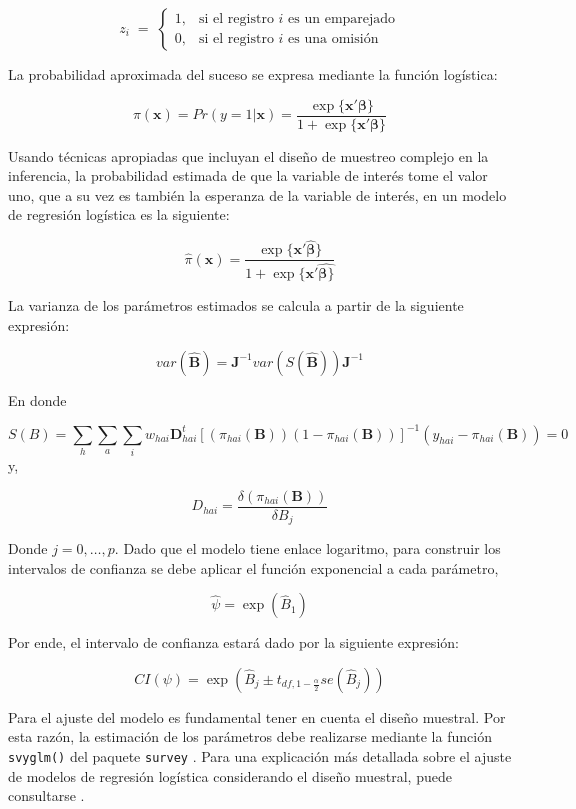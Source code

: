 \documentclass[
  12pt,
]{book}
\begin{document}
\[
z_i \;=\; 
\begin{cases}
1, & \text{si el registro $i$ es un emparejado}\\
0, & \text{si el registro $i$ es una omisión}
\end{cases}
\]

La probabilidad aproximada del suceso se expresa mediante la función logística:

\begin{equation}
\pi(\textbf{x})= Pr(y = 1 | \textbf{x}) = \frac{\exp\{\textbf{x}'\boldsymbol{\beta}\}}{1+\exp\{\textbf{x}'\boldsymbol{\beta}\}}
\label{eq:prob}
\end{equation}

Usando técnicas apropiadas que incluyan el diseño de muestreo complejo en la inferencia, la probabilidad estimada de que la variable de interés tome el valor uno, que a su vez es también la esperanza de la variable de interés, en un modelo de regresión logística es la siguiente:

\[
\hat{\pi}(\textbf{x})= \frac{\exp\{\textbf{x}'\hat{\boldsymbol{\beta}}\}}{1+\exp\{\textbf{x}'\hat{\boldsymbol{\beta}\}}}
\]

La varianza de los parámetros estimados se calcula a partir de la siguiente expresión:

\[
var\left(\boldsymbol{\hat{B}}\right)=\boldsymbol{J}^{-1}var\left(S\left(\hat{\boldsymbol{B}}\right)\right)\boldsymbol{J}^{-1}
\]

En donde

\[
S\left(B\right)=\sum_{h}\sum_{a}\sum_{i}w_{hai}\boldsymbol{D}_{hai}^{t}\left[\left(\pi_{hai}\left(\boldsymbol{B}\right)\right)\left(1-\pi_{hai}\left(\boldsymbol{B}\right)\right)\right]^{-1}\left(y_{hai}-\pi_{hai}\left(\boldsymbol{B}\right)\right)=0
\]
y,

\[
D_{hai} = \frac{\delta\left(\pi_{hai}\left(\boldsymbol{B}\right)\right)}{\delta B_{j}}
\]

Donde \(j=0,\dots,p\). Dado que el modelo tiene enlace logaritmo, para construir los intervalos de confianza se debe aplicar el función exponencial a cada parámetro,

\[
\hat{\psi}=\exp\left(\hat{B}_{1}\right)
\]

Por ende, el intervalo de confianza estará dado por la siguiente expresión:

\[
CI\left(\psi\right)=\exp\left(\hat{B}_{j}\pm t_{df,1-\frac{\alpha}{2}}se\left(\hat{B}_{j}\right)\right)
\]

Para el ajuste del modelo es fundamental tener en cuenta el diseño muestral. Por esta razón, la estimación de los parámetros debe realizarse mediante la función \texttt{svyglm()} del paquete \texttt{survey} \citep{Lumley2010}. Para una explicación más detallada sobre el ajuste de modelos de regresión logística considerando el diseño muestral, puede consultarse \citet{gutierrez2025generalizados}.
\end{document}
